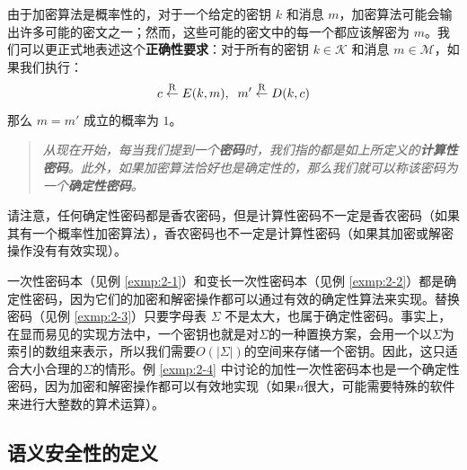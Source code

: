 由于加密算法是概率性的，对于一个给定的密钥 $k$ 和消息 $m$，加密算法可能会输出许多可能的密文之一；然而，这些可能的密文中的每一个都应该解密为 $m$。我们可以更正式地表述这个\textbf{正确性要求}：对于所有的密钥 $k\in\mathcal{K}$ 和消息 $m\in\mathcal{M}$，如果我们执行：
$$
c\overset{\rm R}\leftarrow E(k,m),\;\;
m'\overset{\rm R}\leftarrow D(k,c)
$$
那么 $m=m'$ 成立的概率为 $1$。


\begin{quote}
\begin{tcolorbox}[colframe=black,colback=white,boxrule=0.6pt,arc=0pt]
\emph{从现在开始，每当我们提到一个\textbf{密码}时，我们指的都是如上所定义的\textbf{计算性密码}。此外，如果加密算法恰好也是确定性的，那么我们就可以称该密码为一个\textbf{确定性密码}。}
\end{tcolorbox}
\end{quote}

请注意，任何确定性密码都是香农密码，但是计算性密码不一定是香农密码（如果其有一个概率性加密算法），香农密码也不一定是计算性密码（如果其加密或解密操作没有有效实现）。

\begin{example}
一次性密码本（见例 \ref{exmp:2-1}）和变长一次性密码本（见例 \ref{exmp:2-2}）都是确定性密码，因为它们的加密和解密操作都可以通过有效的确定性算法来实现。替换密码（见例 \ref{exmp:2-3}）只要字母表 $\Sigma$ 不是太大，也属于确定性密码。事实上，在显而易见的实现方法中，一个密钥也就是对$\Sigma$的一种置换方案，会用一个以$\Sigma$为索引的数组来表示，所以我们需要$O(|\Sigma|)$的空间来存储一个密钥。因此，这只适合大小合理的$\Sigma$的情形。例 \ref{exmp:2-4} 中讨论的加性一次性密码本也是一个确定性密码，因为加密和解密操作都可以有效地实现（如果$n$很大，可能需要特殊的软件来进行大整数的算术运算）。
\end{example}

\subsection{语义安全性的定义}

